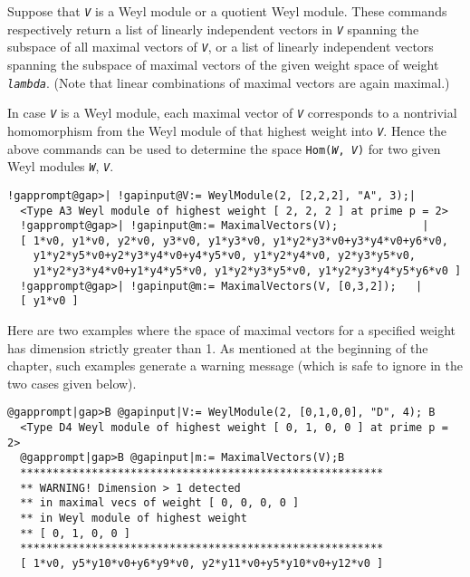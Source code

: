 \documentclass[a4paper,11pt]{report}
\begin{document}
{{{ Suppose that \mbox{\texttt{\mdseries\slshape V}} is a Weyl module or a quotient Weyl module. These commands respectively return
a list of linearly independent vectors in \mbox{\texttt{\mdseries\slshape V}} spanning the subspace of all maximal vectors of \mbox{\texttt{\mdseries\slshape V}}, or a list of linearly independent vectors spanning the subspace of maximal
vectors of the given weight space of weight \mbox{\texttt{\mdseries\slshape lambda}}. (Note that linear combinations of maximal vectors are again maximal.) 

 In case \mbox{\texttt{\mdseries\slshape V}} is a Weyl module, each maximal vector of \mbox{\texttt{\mdseries\slshape V}} corresponds to a nontrivial homomorphism from the Weyl module of that highest
weight into \mbox{\texttt{\mdseries\slshape V}}. Hence the above commands can be used to determine the space \texttt{Hom(\mbox{\texttt{\mdseries\slshape W}}, \mbox{\texttt{\mdseries\slshape V}})} for two given Weyl modules \mbox{\texttt{\mdseries\slshape W}}, \mbox{\texttt{\mdseries\slshape V}}. 
\begin{Verbatim}[commandchars=!@|,fontsize=\small,frame=single,label=Example]
  !gapprompt@gap>| !gapinput@V:= WeylModule(2, [2,2,2], "A", 3);|
  <Type A3 Weyl module of highest weight [ 2, 2, 2 ] at prime p = 2>
  !gapprompt@gap>| !gapinput@m:= MaximalVectors(V);             |
  [ 1*v0, y1*v0, y2*v0, y3*v0, y1*y3*v0, y1*y2*y3*v0+y3*y4*v0+y6*v0, 
    y1*y2*y5*v0+y2*y3*y4*v0+y4*y5*v0, y1*y2*y4*v0, y2*y3*y5*v0, 
    y1*y2*y3*y4*v0+y1*y4*y5*v0, y1*y2*y3*y5*v0, y1*y2*y3*y4*y5*y6*v0 ]
  !gapprompt@gap>| !gapinput@m:= MaximalVectors(V, [0,3,2]);   |
  [ y1*v0 ]
\end{Verbatim}
 Here are two examples where the space of maximal vectors for a specified
weight has dimension strictly greater than 1. As mentioned at the beginning of
the chapter, such examples generate a warning message (which is safe to ignore
in the two cases given below). 
\begin{Verbatim}[commandchars=@|B,fontsize=\small,frame=single,label=Example]
  @gapprompt|gap>B @gapinput|V:= WeylModule(2, [0,1,0,0], "D", 4); B
  <Type D4 Weyl module of highest weight [ 0, 1, 0, 0 ] at prime p = 2>
  @gapprompt|gap>B @gapinput|m:= MaximalVectors(V);B
  ********************************************************
  ** WARNING! Dimension > 1 detected
  ** in maximal vecs of weight [ 0, 0, 0, 0 ]
  ** in Weyl module of highest weight
  ** [ 0, 1, 0, 0 ]
  ********************************************************
  [ 1*v0, y5*y10*v0+y6*y9*v0, y2*y11*v0+y5*y10*v0+y12*v0 ]

\end{Verbatim}}}}
\end{document}
